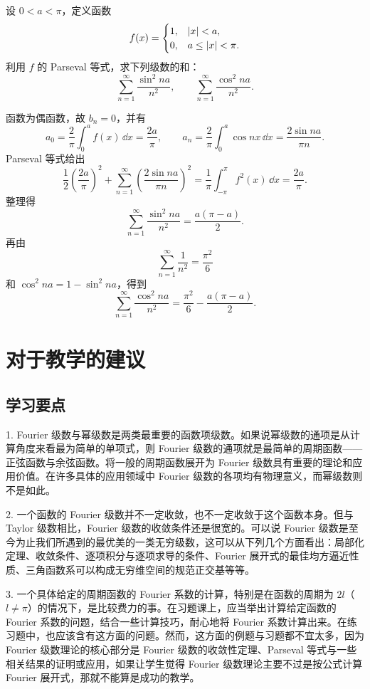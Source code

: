 \begin{xexercise}[10]
设 $0<a<\pi$，定义函数
  \[
    f(x)=\begin{cases}
      1,&\lvert x\rvert<a,\\
      0,&a\le\lvert x\rvert<\pi.
    \end{cases}
  \]
  利用 $f$ 的 Parseval 等式，求下列级数的和：
  \[
    \sum_{n=1}^{\infty}\frac{\sin^2na}{n^2},\qquad
    \sum_{n=1}^{\infty}\frac{\cos^2na}{n^2}.
  \]
\end{xexercise}
\begin{xsolution}
函数为偶函数，故 $b_n=0$，并有
\[
  a_0=\frac2\pi\int_0^af(x)\,\dd x=\frac{2a}{\pi},
\qquad
  a_n=\frac2\pi\int_0^a\cos nx\,\dd x
  =\frac{2\sin na}{\pi n}.
\]
Parseval 等式给出
\[
  \frac12\left(\frac{2a}{\pi}\right)^2
  +\sum_{n=1}^{\infty}\left(\frac{2\sin na}{\pi n}\right)^2
  =\frac1\pi\int_{-\pi}^{\pi}f^2(x)\,\dd x
  =\frac{2a}{\pi}.
\]
整理得
\[
  \boxed{\displaystyle
  \sum_{n=1}^{\infty}\frac{\sin^2na}{n^2}
  =\frac{a(\pi-a)}2}.
\]
再由
\[
  \sum_{n=1}^{\infty}\frac1{n^2}=\frac{\pi^2}{6}
\]
和 $\cos^2na=1-\sin^2na$，得到
\[
  \boxed{\displaystyle
  \sum_{n=1}^{\infty}\frac{\cos^2na}{n^2}
  =\frac{\pi^2}{6}-\frac{a(\pi-a)}2}.
\]
\end{xsolution}


\section{对于教学的建议}

\subsection{学习要点}

1. Fourier 级数与幂级数是两类最重要的函数项级数。如果说幂级数的通项是从计算角度来看最为简单的单项式，则 Fourier 级数的通项就是最简单的周期函数——正弦函数与余弦函数。将一般的周期函数展开为 Fourier 级数具有重要的理论和应用价值。在许多具体的应用领域中 Fourier 级数的各项均有物理意义，而幂级数则不是如此。

2. 一个函数的 Fourier 级数并不一定收敛，也不一定收敛于这个函数本身。但与 Taylor 级数相比，Fourier 级数的收敛条件还是很宽的。可以说 Fourier 级数是至今为止我们所遇到的最优美的一类无穷级数，这可以从下列几个方面看出：局部化定理、收敛条件、逐项积分与逐项求导的条件、Fourier 展开式的最佳均方逼近性质、三角函数系可以构成无穷维空间的规范正交基等等。

3. 一个具体给定的周期函数的 Fourier 系数的计算，特别是在函数的周期为 $2l$（$l\ne\pi$）的情况下，是比较费力的事。在习题课上，应当举出计算给定函数的 Fourier 系数的问题，结合一些计算技巧，耐心地将 Fourier 系数计算出来。在练习题中，也应该含有这方面的问题。然而，这方面的例题与习题都不宜太多，因为 Fourier 级数理论的核心部分是 Fourier 级数的收敛性定理、Parseval 等式与一些相关结果的证明或应用，如果让学生觉得 Fourier 级数理论主要不过是按公式计算 Fourier 展开式，那就不能算是成功的教学。

